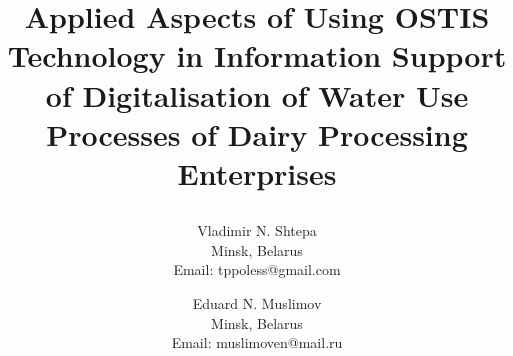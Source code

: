 \documentclass[a4paper]{article}
\begin{document}
\setlength\parindent{11pt}
\fontsize{10}{13}\selectfont

\title{
 \begin{spacing}{0.7} %
  {\Huge\nohyphens{Applied Aspects of Using OSTIS Technology in
Information Support of Digitalisation of Water
Use Processes of Dairy Processing Enterprises}}
 \end{spacing}
}
\author{ 
 \linespread{1.3} Vladimir N. Shtepa\\Minsk, Belarus\\Email: tppoless@gmail.com                  %
 \and
 Eduard N. Muslimov\\Minsk, Belarus\\Email: muslimoven@mail.ru
}
\date{}
\maketitle
\end{document}
